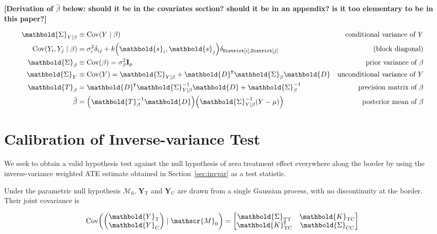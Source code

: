 \documentclass[letter]{article}
\DeclarePairedDelimiter{\parenthesis}{\lparen}{\rparen}
\DeclarePairedDelimiter{\squarebracket}{\lbrack}{\rbrack}
\newcommand{\del}[1]{\parenthesis*{#1}}
\newcommand{\sbr}[1]{\squarebracket*{#1}}
\DeclareMathOperator{\cov}{{Cov}}
\newcommand{\district}{\mathtt{District}}
\newcommand*{\trans}{^{\mkern-1.5mu\intercal}}
\newcommand{\treat}{\mathrm{T}}
\newcommand{\ctrol}{\mathrm{C}}
\newcommand{\sigman}{\sigma_{\epsilon}}
\newcommand{\svec}{\mathbold{s}}
\newcommand{\Yvec}{\mathbold{Y}}
\newcommand{\yt}{\Yvec_{\treat}}
\newcommand{\yc}{\Yvec_{\ctrol}}
\newcommand{\eye}{\mathbf{I}}
\newcommand{\modnull}{\mathscr{M}_0}
\newcommand{\Dmat}{\mathbold{D}}
\newcommand{\Kmat}{\mathbold{K}}
\newcommand{\SigmaMat}{\mathbold{\Sigma}}
\newcommand{\STT}{\SigmaMat_{\treat \treat}}
\newcommand{\SCC}{\SigmaMat_{\ctrol \ctrol}}
\newcommand{\KTC}{\Kmat_{\treat \ctrol}}
\begin{document}
\textbf{{[}Derivation of \(\hat{\beta}\) below: should it be in the covariates section? should it be in an appendix? is it too elementary to be in this paper?{]}}

\begin{equation}
\begin{aligned}
    \SigmaMat_{Y \mid \beta} &\equiv \cov\del{Y \mid \beta } 
        & \text{conditional variance of $Y$} \\
    \cov\del{Y_i , Y_j \mid \beta } &= \sigman^2 \delta_{ij} + k\del{\svec_i,\svec_j} \delta_{\district\sbr{i},\district\sbr{j}} & \text{(block diagonal)}\\
    \SigmaMat_\beta &\equiv \cov\del{\beta} = \sigma_\beta^2 \eye_p
        & \text{prior variance of $\beta$} \\
    \SigmaMat_Y &\equiv \cov\del{Y} = \SigmaMat_{Y \mid \beta} + \Dmat\trans \SigmaMat_\beta \Dmat
        & \text{unconditional variance of $Y$} \\
    \mathbold{T}_\beta &= \Dmat\trans \SigmaMat_{Y \mid \beta}^{-1} \Dmat + \SigmaMat^{-1}_\beta 
        & \text{precision matrix of $\beta$} \\
    \hat\beta &= \del{\mathbold{T}_\beta^{-1} \Dmat} \del{ \SigmaMat_{Y \mid \beta}^{-1} \del{Y-\mu}}
        & \text{posterior mean of $\beta$}
\end{aligned}
\end{equation}
    


    	\section{Calibration of Inverse-variance Test}\label{calibration-of-inverse-variance-test}
    


    	\label{sec:calibration}
    


    	We seek to obtain a valid hypothesis test against the null hypothesis of zero treatment effect everywhere along the border by using the inverse-variance weighted ATE estimate obtained in Section~\ref{sec:invvar} as a test statistic.
    


    	Under the parametric null hypothesis \(\modnull\), \(\yt{}\) and \(\yc{}\) are drawn from a single Gaussian process, with no discontinuity at the border.
Their joint covariance is

\begin{equation}
    \cov \del{\begin{pmatrix}\yt{} \\ \yc{}\end{pmatrix} \mid \modnull } 
    = \begin{bmatrix}
        \STT & \KTC \\
        \KTC \trans & \SCC
    \end{bmatrix}
\end{equation}
\end{document}
